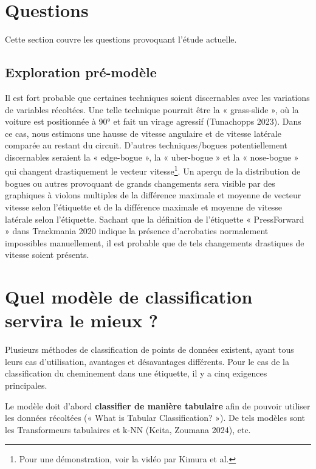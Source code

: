 \documentclass[
  oneside,
  open=any]{scrreprt}
\begin{document}
\section{Questions}\label{questions}

Cette section couvre les questions provoquant l'étude actuelle.

\subsection{Exploration pré-modèle}\label{exploration-pruxe9-moduxe8le}

Il est fort probable que certaines techniques soient discernables avec
les variations de variables récoltées. Une telle technique pourrait être
la « grass-slide », où la voiture est positionnée à 90° et fait un
virage agressif (Tunachopps 2023). Dans ce cas, nous estimons une hausse
de vitesse angulaire et de vitesse latérale comparée au restant du
circuit. D'autres techniques/bogues potentiellement discernables
seraient la « edge-bogue », la « uber-bogue » et la « nose-bogue » qui
changent drastiquement le vecteur vitesse\footnote{Pour une
  démonstration, voir la vidéo par Kimura et al.}. Un aperçu de la
distribution de bogues ou autres provoquant de grands changements sera
visible par des graphiques à violons multiples de la différence maximale
et moyenne de vecteur vitesse selon l'étiquette et de la différence
maximale et moyenne de vitesse latérale selon l'étiquette. Sachant que
la définition de l'étiquette « PressForward » dans Trackmania 2020
indique la présence d'acrobaties normalement impossibles manuellement,
il est probable que de tels changements drastiques de vitesse soient
présents.

\section{Quel modèle de classification servira le mieux
?}\label{sec-which-model-hypothesis}

Plusieurs méthodes de classification de points de données existent,
ayant tous leurs cas d'utilisation, avantages et désavantages
différents. Pour le cas de la classification du cheminement dans une
étiquette, il y a cinq exigences principales.

Le modèle doit d'abord \textbf{classifier de manière tabulaire} afin de
pouvoir utiliser les données récoltées (« What is Tabular
Classification? »). De tels modèles sont les Transformeurs tabulaires et
k-NN (Keita, Zoumana 2024), etc.
\end{document}
